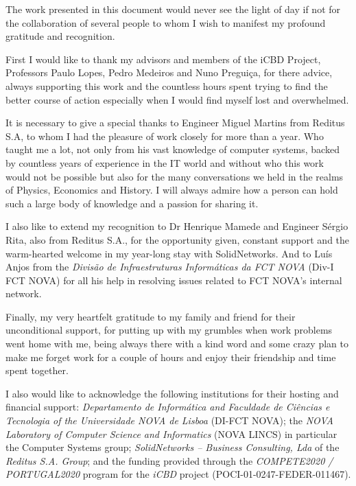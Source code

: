 \acknowledgements

The work presented in this document would never see the light of day if not for the collaboration of several people to whom I wish to manifest my profound gratitude and recognition. 

First I would like to thank my advisors and members of the iCBD Project, Professors Paulo Lopes, Pedro Medeiros and Nuno Preguiça, for there advice, always supporting this work and the countless hours spent trying to find the better course of action especially when I would find myself lost and overwhelmed.

It is necessary to give a special thanks to Engineer Miguel Martins from Reditus S.A, to whom I had the pleasure of work closely for more than a year. Who taught me a lot, not only from his vast knowledge of computer systems, backed by countless years of experience in the IT world and without who this work would not be possible but also for the many conversations we held in the realms of Physics, Economics and History. I will always admire how a person can hold such a large body of knowledge and a passion for sharing it.

I also like to extend my recognition to Dr Henrique Mamede and Engineer Sérgio Rita, also from Reditus S.A., for the opportunity given, constant support and the warm-hearted welcome in my year-long stay with SolidNetworks. And to Luís Anjos from the \textit{Divisão de Infraestruturas Informáticas da FCT NOVA} (Div-I FCT NOVA) for all his help in resolving issues related to FCT NOVA's internal network.

Finally, my very heartfelt gratitude to my family and friend for their unconditional support, for putting up with my grumbles when work problems went home with me, being always there with a kind word and some crazy plan to make me forget work for a couple of hours and enjoy their friendship and time spent together.

I also would like to acknowledge the following institutions for their hosting and financial support: \textit{Departamento de Informática and Faculdade de Ciências e Tecnologia of the Universidade NOVA de Lisboa} (DI-FCT NOVA); the \textit{NOVA Laboratory of Computer Science and Informatics} (NOVA LINCS) in particular the Computer Systems group; \textit{SolidNetworks – Business Consulting, Lda} of the \textit{Reditus S.A. Group}; and the funding provided through the \textit{COMPETE2020 / PORTUGAL2020} program for the \textit{iCBD} project (POCI-01-0247-FEDER-011467).